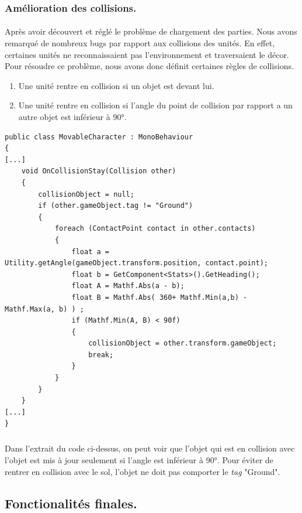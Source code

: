 \documentclass{report}
\begin{document}
\subsubsection{Amélioration des collisions.}
\paragraph{} Après avoir découvert et réglé le problème de chargement des parties. Nous avons remarqué de nombreux bugs par rapport aux collisions des unités. En effet, certaines unités ne reconnaissaient pas l'environnement et traversaient le décor. Pour résoudre ce problème, nous avons donc définit certaines règles de collisions.
\begin{enumerate}
\item Une unité rentre en collision si un objet est devant lui. 
\item Une unité rentre en collision si l'angle du point de collision par rapport a un autre objet est inférieur à 90°.
\end{enumerate}

 \begin{lstlisting}[language={[Sharp]C},label={lst:MovableCharacterCollisionScript}, caption= Extrait du code de MovableCharacter.cs]
public class MovableCharacter : MonoBehaviour
{
[...]
    void OnCollisionStay(Collision other)
    {
        collisionObject = null;
        if (other.gameObject.tag != "Ground")
        {
            foreach (ContactPoint contact in other.contacts)
            {
                float a = Utility.getAngle(gameObject.transform.position, contact.point);
                float b = GetComponent<Stats>().GetHeading();
                float A = Mathf.Abs(a - b);
                float B = Mathf.Abs( 360+ Mathf.Min(a,b) - Mathf.Max(a, b) ) ;
                if (Mathf.Min(A, B) < 90f)
                {
                    collisionObject = other.transform.gameObject;
                    break;
                }
            }
        }
    }
[...]
}
\end{lstlisting}
\subparagraph{} Dans l'extrait du code ci-dessus, on peut voir que l'objet qui est en collision avec l'objet est mis à jour seulement si l'angle est inférieur à 90°. Pour éviter de rentrer en collision avec le sol, l'objet ne doit pas comporter le \textit{tag} "Ground".

\subsection{Fonctionalités finales.}
\end{document}
